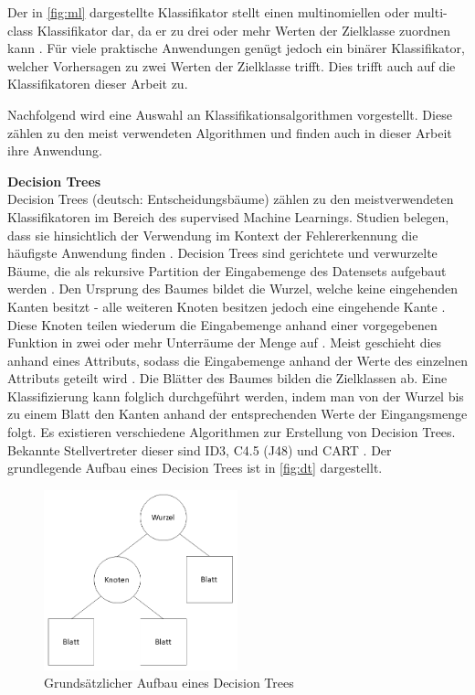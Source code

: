 Der in \autoref{fig:ml} dargestellte Klassifikator stellt einen multinomiellen oder multi-class Klassifikator dar, da er zu drei oder mehr Werten der Zielklasse zuordnen kann \cite{Sammut2017}. Für viele praktische Anwendungen genügt jedoch ein binärer Klassifikator, welcher Vorhersagen zu zwei Werten der Zielklasse trifft. Dies trifft auch auf die Klassifikatoren dieser Arbeit zu.

Nachfolgend wird eine Auswahl an Klassifikationsalgorithmen vorgestellt. Diese zählen zu den meist verwendeten Algorithmen und finden auch in dieser Arbeit ihre Anwendung.

\label{algorithms}
\textbf{Decision Trees\medskip}\\
Decision Trees (deutsch: Entscheidungsbäume) zählen zu den meistverwendeten Klassifikatoren im Bereich des supervised Machine Learnings. Studien belegen, dass sie hinsichtlich der Verwendung im Kontext der Fehlererkennung die häufigste Anwendung finden \cite{Son2019}. Decision Trees sind gerichtete und verwurzelte Bäume, die als rekursive Partition der Eingabemenge des Datensets aufgebaut werden \cite{Rokach2005}. Den Ursprung des Baumes bildet die Wurzel, welche keine eingehenden Kanten besitzt - alle weiteren Knoten besitzen jedoch eine eingehende Kante \cite{Rokach2005}. Diese Knoten teilen wiederum die Eingabemenge anhand einer vorgegebenen Funktion in zwei oder mehr Unterräume der Menge auf \cite{Rokach2005}. Meist geschieht dies anhand eines Attributs, sodass die Eingabemenge anhand der Werte des einzelnen Attributs geteilt wird \cite{Rokach2005}. Die Blätter des Baumes bilden die Zielklassen ab. Eine Klassifizierung kann folglich durchgeführt werden, indem man von der Wurzel bis zu einem Blatt den Kanten anhand der entsprechenden Werte der Eingangsmenge folgt. Es existieren verschiedene Algorithmen zur Erstellung von Decision Trees. Bekannte Stellvertreter dieser sind ID3, C4.5 (J48) und CART \cite{Rokach2005}. Der grundlegende Aufbau eines Decision Trees ist in \autoref{fig:dt} dargestellt.

\begin{figure}[ht]
    \centering
    \includegraphics[width=0.5\textwidth]{images/DT}
    \caption{Grundsätzlicher Aufbau eines Decision Trees\label{fig:dt}}
\end{figure}

